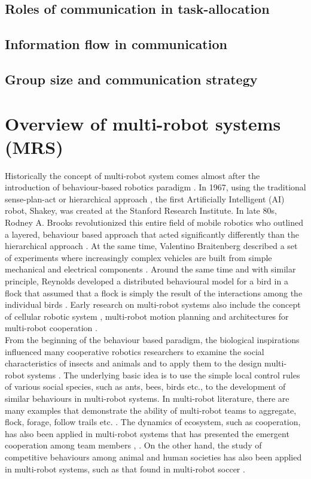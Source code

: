 \subsection{Roles of communication in task-allocation}

\subsection{Information flow in communication}

\subsection{Group size and communication strategy}
\section{Overview of multi-robot systems (MRS)}
\label{bg:mrs}
Historically the concept of multi-robot system comes almost after the introduction of behaviour-based robotics paradigm \cite{Brooks1986,Arkin1990}. In 1967, using the traditional sense-plan-act or hierarchical approach \cite{Murphy2000}, the first Artificially Intelligent (AI) robot, Shakey, was created at the Stanford Research Institute. In late 80s, Rodney A. Brooks revolutionized this entire field of mobile robotics who outlined a layered, behaviour based approach that acted significantly differently than the hierarchical approach \cite{Brooks1986}. At the same time, Valentino Braitenberg described a set of experiments where increasingly complex vehicles are built from simple mechanical and electrical components \cite{Braitenberg1984}. Around the same time and with similar principle, Reynolds developed a distributed behavioural model for a bird in a flock that assumed that a flock is simply the result of the interactions among the individual birds \cite{Reynolds1987}. Early research on multi-robot systems also include the concept of cellular robotic system \cite{Fukuda+1987}, \cite{Beni1988} multi-robot motion planning \cite{Arai+1989,Premvuti+1990,Wang1989} and architectures for multi-robot cooperation \cite{Asama+1989}.\\
%
From the beginning of the behaviour based paradigm, the biological inspirations influenced many cooperative robotics researchers to examine the social characteristics of insects and animals and to apply them to the design multi-robot systems \cite{Arkin1998}. The underlying basic idea is to use the simple local control rules of various social species, such as ants, bees, birds etc., to the development of similar behaviours in multi-robot systems. In multi-robot literature, there are many examples that demonstrate the ability of multi-robot teams to aggregate, flock, forage, follow trails etc. \cite{Bonabeau+1999,Mataric1994}. The dynamics of ecosystem, such as cooperation, has also been applied in multi-robot systems that has presented the emergent cooperation among team members \cite{Mcfarland1994}, \cite{Martinoli+1996}. On the other hand, the study of competitive behaviours among animal and human societies has also been applied in multi-robot systems, such as that found in multi-robot soccer \cite{Asada+1999}.\\
